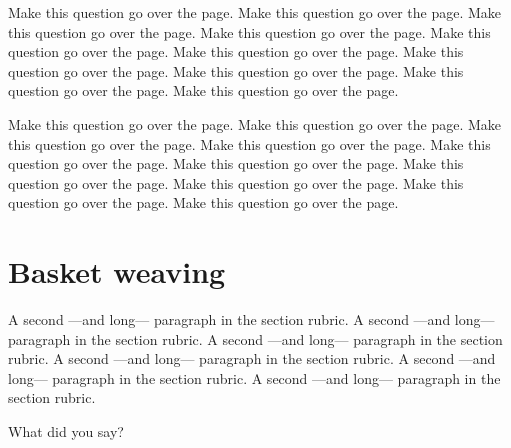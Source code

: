 \documentclass[answers]{UoYClosedExam}
\begin{document}
\begin{question}{25}
Make this question go over the page.  Make this question go over the
page.  Make this question go over the page.  Make this question go
over the page.  Make this question go over the page.  Make this
question go over the page.  Make this question go over the page.  Make
this question go over the page.  Make this question go over the page.
Make this question go over the page.

Make this question go over the page.  Make this question go over the
page.  Make this question go over the page.  Make this question go
over the page.  Make this question go over the page.  Make this
question go over the page.  Make this question go over the page.  Make
this question go over the page.  Make this question go over the page.
Make this question go over the page.
\end{question}

\section{Basket weaving}{\SeparateAnswerBook

A second ---and long--- paragraph in the section rubric.  A second
---and long--- paragraph in the section rubric.  A second ---and
long--- paragraph in the section rubric.  A second ---and long---
paragraph in the section rubric.  A second ---and long--- paragraph in
the section rubric.  A second ---and long--- paragraph in the section
rubric.
}\label{BW:Sec}

\begin{question}{25}{}
What did you say?
\end{question}

\end{document}
